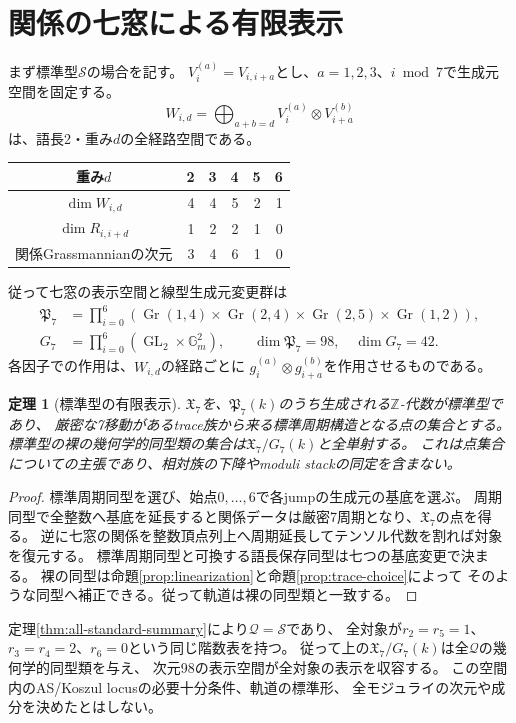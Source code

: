 \documentclass[11pt,a4paper]{ltjsarticle}
\newtheorem{theorem}{定理}[section]
\theoremstyle{definition}
\newcommand{\ZZ}{\mathbb Z}
\newcommand{\GG}{\mathbb G}
\newcommand{\Gr}{\operatorname{Gr}}
\newcommand{\GL}{\operatorname{GL}}
\begin{document}
\section{関係の七窓による有限表示}
まず標準型$\mathcal S$の場合を記す。
$V_i^{(a)}=V_{i,i+a}$とし、$a=1,2,3$、$i\bmod7$で生成元空間を固定する。
\[
W_{i,d}=\bigoplus_{a+b=d}V_i^{(a)}\otimes V_{i+a}^{(b)}
\]
は、語長2・重み$d$の全経路空間である。
\begin{center}
\begin{tabular}{c|rrrrr}
\toprule
重み$d$ & 2 & 3 & 4 & 5 & 6\\
\midrule
$\dim W_{i,d}$ & 4 & 4 & 5 & 2 & 1\\
$\dim R_{i,i+d}$ & 1 & 2 & 2 & 1 & 0\\
関係Grassmannianの次元 & 3 & 4 & 6 & 1 & 0\\
\bottomrule
\end{tabular}
\end{center}
従って七窓の表示空間と線型生成元変更群は
\begin{align*}
\mathfrak P_7&=\prod_{i=0}^{6}
\left(\Gr(1,4)\times\Gr(2,4)\times\Gr(2,5)\times\Gr(1,2)\right),\\
G_7&=\prod_{i=0}^{6}\left(\GL_2\times\GG_m^2\right),
\qquad \dim\mathfrak P_7=98,\quad\dim G_7=42.
\end{align*}
各因子での作用は、$W_{i,d}$の経路ごとに
$g_i^{(a)}\otimes g_{i+a}^{(b)}$を作用させるものである。

\begin{theorem}[標準型の有限表示]\label{thm:finite-window}
$\mathfrak X_7$を、$\mathfrak P_7(k)$のうち生成される$\ZZ$-代数が標準型であり、
厳密な7移動があるtrace族から来る標準周期構造となる点の集合とする。
標準型の裸の幾何学的同型類の集合は$\mathfrak X_7/G_7(k)$と全単射する。
これは点集合についての主張であり、相対族の下降やmoduli stackの同定を含まない。
\end{theorem}
\begin{proof}
標準周期同型を選び、始点$0,\ldots,6$で各jumpの生成元の基底を選ぶ。
周期同型で全整数へ基底を延長すると関係データは厳密7周期となり、$\mathfrak X_7$の点を得る。
逆に七窓の関係を整数頂点列上へ周期延長してテンソル代数を割れば対象を復元する。
標準周期同型と可換する語長保存同型は七つの基底変更で決まる。
裸の同型は命題\ref{prop:linearization}と命題\ref{prop:trace-choice}によって
そのような同型へ補正できる。従って軌道は裸の同型類と一致する。
\end{proof}

定理\ref{thm:all-standard-summary}により$\mathcal Q=\mathcal S$であり、
全対象が$r_2=r_5=1$、$r_3=r_4=2$、$r_6=0$という同じ階数表を持つ。
従って上の$\mathfrak X_7/G_7(k)$は全$\mathcal Q$の幾何学的同型類を与え、
次元98の表示空間が全対象の表示を収容する。
この空間内のAS/Koszul locusの必要十分条件、軌道の標準形、
全モジュライの次元や成分を決めたとはしない。
\end{document}
